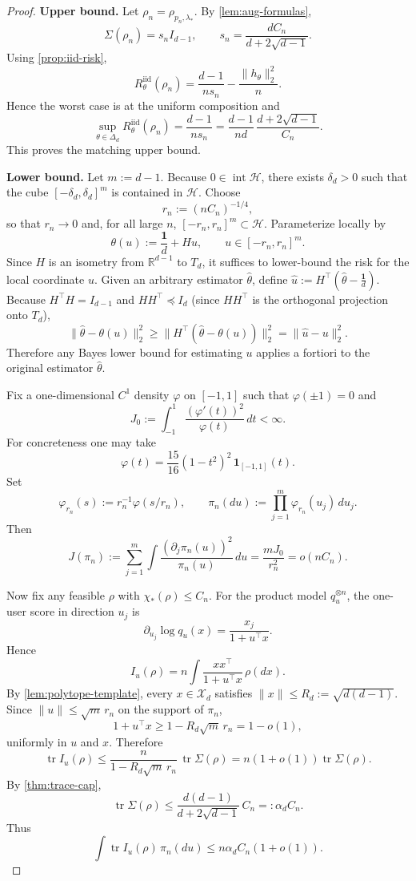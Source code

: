 \documentclass[11pt]{amsart}
\theoremstyle{definition}
\DeclareMathOperator{\tr}{tr}
\newcommand{\one}{\mathbf 1}
\newcommand{\R}{\mathbb R}
\newcommand{\cX}{\mathcal X}
\newcommand{\cH}{\mathcal H}
\begin{document}
\begin{proof}
\textbf{Upper bound.}
Let $\rho_n=\rho_{p_n,\lambda_*}$. By \cref{lem:aug-formulas},
\[
\Sigma(\rho_n)=s_n I_{d-1},
\qquad
s_n=\frac{dC_n}{d+2\sqrt{d-1}}.
\]
Using \cref{prop:iid-risk},
\[
R^{\mathrm{iid}}_\theta(\rho_n)=\frac{d-1}{n s_n}-\frac{\|h_\theta\|_2^2}{n}.
\]
Hence the worst case is at the uniform composition and
\[
\sup_{\theta\in\Delta_d}R^{\mathrm{iid}}_\theta(\rho_n)=\frac{d-1}{n s_n}=\frac{d-1}{nd}\,\frac{d+2\sqrt{d-1}}{C_n}.
\]
This proves the matching upper bound.

\textbf{Lower bound.}
Let $m:=d-1$. Because $0\in\operatorname{int}\cH$, there exists $\delta_d>0$ such that the cube $[-\delta_d,\delta_d]^m$ is contained in $\cH$. Choose
\[
r_n:=(nC_n)^{-1/4},
\]
so that $r_n\to 0$ and, for all large $n$, $[-r_n,r_n]^m\subset\cH$.
Parameterize locally by
\[
\theta(u):=\frac{\one}{d}+Hu,
\qquad u\in[-r_n,r_n]^m.
\]
Since $H$ is an isometry from $\R^{d-1}$ to $T_d$, it suffices to lower-bound the risk for the local coordinate $u$. Given an arbitrary estimator $\widehat\theta$, define $\widehat u:=H^\top\!\left(\widehat\theta-\frac{\one}{d}\right)$. Because $H^\top H=I_{d-1}$ and $HH^\top\preceq I_d$ (since $HH^\top$ is the orthogonal projection onto $T_d$),
\[
\|\widehat\theta-\theta(u)\|_2^2\ge \|H^\top(\widehat\theta-\theta(u))\|_2^2=\|\widehat u-u\|_2^2.
\]
Therefore any Bayes lower bound for estimating $u$ applies a fortiori to the original estimator $\widehat\theta$.

Fix a one-dimensional $C^1$ density $\varphi$ on $[-1,1]$ such that $\varphi(\pm 1)=0$ and
\[
J_0:=\int_{-1}^1 \frac{(\varphi'(t))^2}{\varphi(t)}\,dt<\infty.
\]
For concreteness one may take
\[
\varphi(t)=\frac{15}{16}(1-t^2)^2\,\mathbf 1_{[-1,1]}(t).
\]
Set
\[
\varphi_{r_n}(s):=r_n^{-1}\varphi(s/r_n),
\qquad
\pi_n(du):=\prod_{j=1}^m \varphi_{r_n}(u_j)\,du_j.
\]
Then
\[
J(\pi_n):=\sum_{j=1}^m \int \frac{(\partial_j \pi_n(u))^2}{\pi_n(u)}\,du=\frac{mJ_0}{r_n^2}=o(nC_n).
\]

Now fix any feasible $\rho$ with $\chi_*(\rho)\le C_n$. For the product model $q_u^{\otimes n}$, the one-user score in direction $u_j$ is
\[
\partial_{u_j}\log q_u(x)=\frac{x_j}{1+u^\top x}.
\]
Hence
\[
I_u(\rho)=n\int \frac{xx^\top}{1+u^\top x}\,\rho(dx).
\]
By \cref{lem:polytope-template}, every $x\in\cX_d$ satisfies $\|x\|\le R_d:=\sqrt{d(d-1)}$. Since $\|u\|\le \sqrt m\,r_n$ on the support of $\pi_n$,
\[
1+u^\top x\ge 1-R_d\sqrt m\,r_n=1-o(1),
\]
uniformly in $u$ and $x$. Therefore
\[
\tr I_u(\rho)\le \frac{n}{1-R_d\sqrt m\,r_n}\,\tr\Sigma(\rho)=n(1+o(1))\tr\Sigma(\rho).
\]
By \cref{thm:trace-cap},
\[
\tr\Sigma(\rho)\le \frac{d(d-1)}{d+2\sqrt{d-1}}\,C_n=:\alpha_d C_n.
\]
Thus
\[
\int \tr I_u(\rho)\,\pi_n(du)\le n\alpha_d C_n(1+o(1)).
\]


\end{proof}
\end{document}
